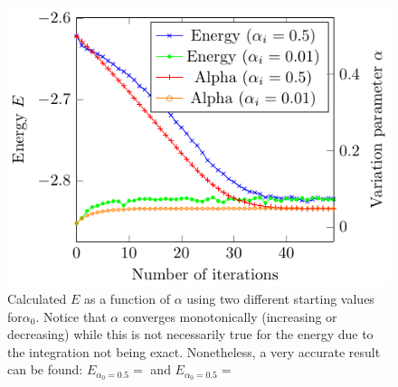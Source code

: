 \begin{figure}
  \begin{center}
  \includegraphics[scale=1 ]{graphs/he-e-alpha-iterations.pdf}
  \caption{
  	Calculated $E$ as a function of $\alpha$ using two different starting values for$\alpha_0$.
		 Notice that $\alpha$ converges monotonically (increasing or decreasing) while this is not necessarily
		  true for the energy due to the integration not being exact. Nonetheless, a very accurate result
			 can be found: $E_{\alpha_0 = 0.5} =  $ and $E_{\alpha_0 = 0.5} =  $
  	}
  \label{fig:He_it}
  \end{center}
\end{figure}
